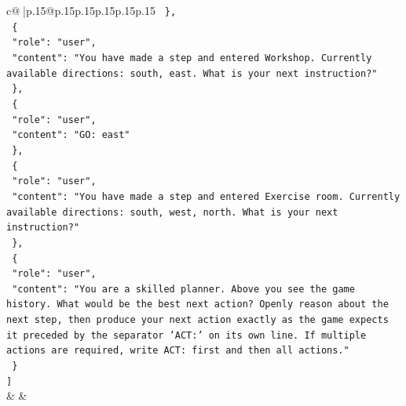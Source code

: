 \documentclass{article}
\begin{document}
{\begin{supertabular}{c@{$\;$}|p{.15\linewidth}@{}p{.15\linewidth}p{.15\linewidth}p{.15\linewidth}p{.15\linewidth}p{.15\linewidth}}
{{{\texttt{  \},} \\
\texttt{  \{} \\
\texttt{    "role": "user",} \\
\texttt{    "content": "You have made a step and entered Workshop. Currently available directions: south, east. What is your next instruction?"} \\
\texttt{  \},} \\
\texttt{  \{} \\
\texttt{    "role": "user",} \\
\texttt{    "content": "GO: east"} \\
\texttt{  \},} \\
\texttt{  \{} \\
\texttt{    "role": "user",} \\
\texttt{    "content": "You have made a step and entered Exercise room. Currently available directions: south, west, north. What is your next instruction?"} \\
\texttt{  \},} \\
\texttt{  \{} \\
\texttt{    "role": "user",} \\
\texttt{    "content": "You are a skilled planner. Above you see the game history. What would be the best next action? Openly reason about the next step, then produce your next action exactly as the game expects it preceded by the separator 'ACT:' on its own line. If multiple actions are required, write ACT: first and then all actions."} \\
\texttt{  \}} \\
\texttt{{]}} \\
            }
        }
    }
    & & \\ \\


\end{supertabular}}
\end{document}

